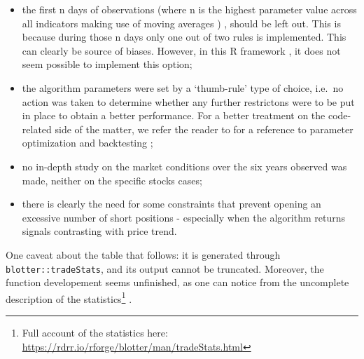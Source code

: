 \documentclass[
  11pt,
]{article}
\begin{document}
\begin{itemize}
\item
  the first n days of observations (where n is the highest parameter
  value across all indicators making use of moving averages ) , should
  be left out. This is because during those n days only one out of two
  rules is implemented. This can clearly be source of biases. However,
  in this R framework , it does not seem possible to implement this
  option;
\item
  the algorithm parameters were set by a `thumb-rule' type of choice,
  i.e.~no action was taken to determine whether any further restrictons
  were to be put in place to obtain a better performance. For a better
  treatment on the code-related side of the matter, we refer the reader
  to \citet{Trice2016} for a reference to parameter optimization and
  backtesting ;
\item
  no in-depth study on the market conditions over the six years observed
  was made, neither on the specific stocks cases;
\item
  there is clearly the need for some constraints that prevent opening an
  excessive number of short positions - especially when the algorithm
  returns signals contrasting with price trend.
\end{itemize}

One caveat about the table that follows: it is generated through
\texttt{blotter::tradeStats}, and its output cannot be truncated.
Moreover, the function developement seems unfinished, as one can notice
from the uncomplete description of the statistics\footnote{Full account
  of the statistics here:
  \url{https://rdrr.io/rforge/blotter/man/tradeStats.html}} .
\end{document}
